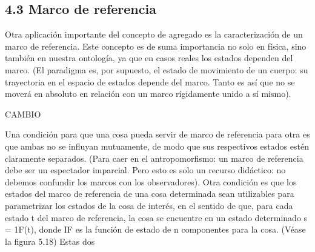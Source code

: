 \begin{justifying}
    \subsection*{4.3 Marco de referencia}
    
    Otra aplicación importante del concepto de agregado es la
    caracterización de un marco de referencia. Este concepto es de suma
    importancia no solo en física, sino también en nuestra ontología, ya que en casos reales
    los estados dependen del marco. (El paradigma es, por supuesto, el estado de
    movimiento de un cuerpo: su trayectoria en el espacio de estados depende del marco. Tanto es así
    que no se moverá en absoluto en relación con un marco rígidamente unido a sí mismo). 

    \pagebreak

    \begin{center}
        CAMBIO
    \end{center}

    Una condición para que una cosa pueda servir de marco de referencia para otra es
    que ambas no se influyan mutuamente, de modo que sus respectivos estados estén
    claramente separados. (Para caer en el antropomorfismo: un marco de referencia
    debe ser un espectador imparcial. Pero esto es solo un recurso didáctico: no debemos
    confundir los marcos con los observadores). Otra condición es que los estados
    del marco de referencia de una cosa determinada sean utilizables para parametrizar
    los estados de la cosa de interés, en el sentido de que, para cada estado t del
    marco de referencia, la cosa se encuentre en un estado determinado s = 1F(t), donde IF es la
    función de estado de n componentes para la cosa. (Véase la figura 5.18) Estas dos 


\end{justifying}
